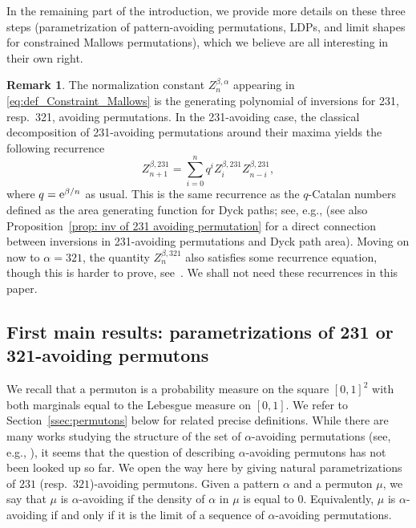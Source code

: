 \documentclass[a4paper,11pt]{amsart}
\newcommand{\ee}{\textup{e}}
\theoremstyle{definition}
\newtheorem{rem}[thm]{Remark}
\begin{document}
In the remaining part of the introduction, we provide more details on these three steps 
(parametrization of pattern-avoiding permutations, LDPs, and limit shapes for constrained Mallows permutations),
which we believe are all interesting in their own right.
\medskip

\begin{rem}
The normalization constant $Z_n^{\beta,\alpha}$ appearing in \eqref{eq:def_Constraint_Mallows} is the generating polynomial of inversions for 231, resp.~321, avoiding permutations.
In the 231-avoiding case, the classical decomposition of 231-avoiding permutations around their maxima yields the following recurrence
\[Z^{\beta,231}_{n+1}= \sum_{i=0}^n q^{i} Z^{\beta,231}_i Z^{\beta,231}_{n-i},\]
where $q=\ee^{\beta/n}$ as usual. This is the same recurrence as the $q$-Catalan numbers defined as 
the area generating function for Dyck paths; see, e.g., \cite[Chapter 1]{haglund2008qt_catalan} (see also Proposition~\ref{prop: inv of 231 avoiding permutation} for a direct connection between inversions in 231-avoiding permutations
and Dyck path area).
Moving on now to $\alpha=321$, the quantity $Z^{\beta,321}_{n}$ also satisfies some recurrence equation, 
though this is harder to prove, see~\cite{cheng2013inversions321avoiding}.
We shall not need these recurrences in this paper.
\end{rem}\medskip



\subsection{First main results: parametrizations of 231 or 321-avoiding permutons}
\label{ssec:parametrization}
We recall that a permuton is a probability measure on the square $[0,1]^2$ with both marginals equal to the Lebesgue measure on $[0,1]$. 
We refer to Section~\ref{ssec:permutons} below for related precise definitions.
While there are many works studying the structure of the set of $\alpha$-avoiding permutations (see, e.g., \cite{vatter2015survey}),
it seems that the question of describing $\alpha$-avoiding permutons has not been looked up so far.
We open the way here by giving natural parametrizations of $231$ (resp.~$321$)-avoiding permutons.
Given a pattern $\alpha$ and a permuton $\mu$, we say that $\mu$ is $\alpha$-avoiding
if the density of $\alpha$ in $\mu$ is equal to $0$. Equivalently, $\mu$ is $\alpha$-avoiding
if and only if it is the limit of a sequence of $\alpha$-avoiding permutations.
\end{document}
